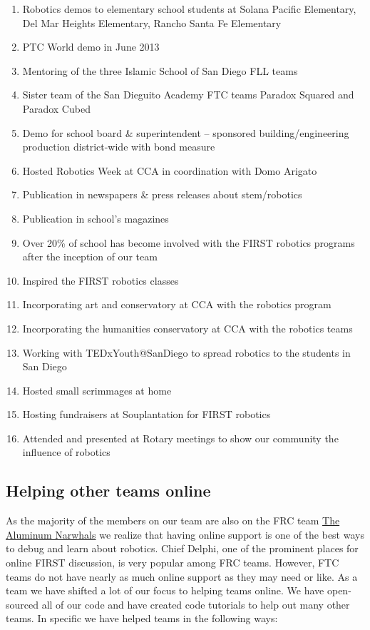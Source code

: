 \begin{enumerate}
\item Robotics demos to elementary school students at Solana Pacific Elementary, Del Mar Heights Elementary, Rancho Santa Fe Elementary
\item PTC World demo in June 2013
\item Mentoring of the three Islamic School of San Diego FLL teams 
\item Sister team of the San Dieguito Academy FTC teams Paradox Squared and Paradox Cubed
\item Demo for school board \& superintendent – sponsored building/engineering production district-wide with bond measure
\item Hosted Robotics Week at CCA in coordination with Domo Arigato
\item Publication in newspapers \& press releases about stem/robotics
\item Publication in school's magazines
\item Over 20\% of school has become involved with the FIRST robotics programs after the inception of our team
\item Inspired the FIRST robotics classes
\item Incorporating art and conservatory at CCA with the robotics program
\item Incorporating the humanities conservatory at CCA with the robotics teams
\item Working with TEDxYouth@SanDiego to spread robotics to the students in San Diego
\item Hosted small scrimmages at home
\item Hosting fundraisers at Souplantation for FIRST robotics
\item Attended and presented at Rotary meetings to show our community the influence of robotics
\end{enumerate}

\subsection{Helping other teams online}
As the majority of the members on our team are also on the FRC team \underline{The Aluminum Narwhals} we realize that having online support is one of the best ways to debug and learn about robotics. Chief Delphi, one of the prominent places for online FIRST discussion, is very popular among FRC teams. However, FTC teams do not have nearly as much online support as they may need or like. As a team we have shifted a lot of our focus to helping teams online. We have open-sourced all of our code and have created code tutorials to help out many other teams. In specific we have helped teams in the following ways:

